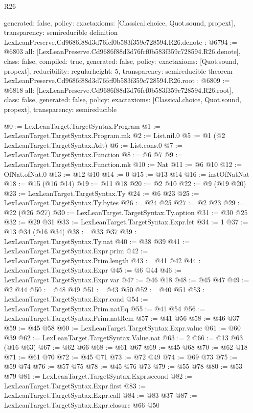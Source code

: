 \begin{lexlean}{R26}
\begin{coremodule}
{  generated: false,
  policy: exact{axioms: [Classical.choice, Quot.sound, propext]},
  transparency: semireducible
}
definition LexLeanPreserve.Cd9686f88d3d76fcf0b583f359c728594.R26.denote : @6794 := @6803 {
  all: [LexLeanPreserve.Cd9686f88d3d76fcf0b583f359c728594.R26.denote],
  class: false,
  compiled: true,
  generated: false,
  policy: exact{axioms: [Quot.sound, propext]},
  reducibility: regular{height: 5},
  transparency: semireducible
}
theorem LexLeanPreserve.Cd9686f88d3d76fcf0b583f359c728594.R26.root : @6809 := @6818 {
  all: [LexLeanPreserve.Cd9686f88d3d76fcf0b583f359c728594.R26.root],
  class: false,
  generated: false,
  policy: exact{axioms: [Classical.choice, Quot.sound, propext]},
  transparency: semireducible
}

@0 := LexLeanTarget.TargetSyntax.Program
@1 := LexLeanTarget.TargetSyntax.Program.mk
@2 := List.nil.{0}
@5 := @1 (@2 LexLeanTarget.TargetSyntax.Adt)
@6 := List.cons.{0}
@7 := LexLeanTarget.TargetSyntax.Function
@8 := @6 @7
@9 := LexLeanTarget.TargetSyntax.Function.mk
@10 := Nat
@11 := @6 @10
@12 := OfNat.ofNat.{0}
@13 := @12 @10
@14 := 0
@15 := @13 @14
@16 := instOfNatNat
@18 := @15 (@16 @14)
@19 := @11 @18
@20 := @2 @10
@22 := @9 (@19 @20)
@23 := LexLeanTarget.TargetSyntax.Ty
@24 := @6 @23
@25 := LexLeanTarget.TargetSyntax.Ty.bytes
@26 := @24 @25
@27 := @2 @23
@29 := @22 (@26 @27)
@30 := LexLeanTarget.TargetSyntax.Ty.option
@31 := @30 @25
@32 := @29 @31
@33 := LexLeanTarget.TargetSyntax.Expr.let
@34 := 1
@37 := @13 @34 (@16 @34)
@38 := @33 @37
@39 := LexLeanTarget.TargetSyntax.Ty.nat
@40 := @38 @39
@41 := LexLeanTarget.TargetSyntax.Expr.prim
@42 := LexLeanTarget.TargetSyntax.Prim.length
@43 := @41 @42
@44 := LexLeanTarget.TargetSyntax.Expr
@45 := @6 @44
@46 := LexLeanTarget.TargetSyntax.Expr.var
@47 := @46 @18
@48 := @45 @47
@49 := @2 @44
@50 := @48 @49
@51 := @43 @50
@52 := @40 @51
@53 := LexLeanTarget.TargetSyntax.Expr.cond
@54 := LexLeanTarget.TargetSyntax.Prim.natEq
@55 := @41 @54
@56 := LexLeanTarget.TargetSyntax.Prim.natRem
@57 := @41 @56
@58 := @46 @37
@59 := @45 @58
@60 := LexLeanTarget.TargetSyntax.Expr.value
@61 := @60 @39
@62 := LexLeanTarget.TargetSyntax.Value.nat
@63 := 2
@66 := @13 @63 (@16 @63)
@67 := @62 @66
@68 := @61 @67
@69 := @45 @68
@70 := @62 @18
@71 := @61 @70
@72 := @45 @71
@73 := @72 @49
@74 := @69 @73
@75 := @59 @74
@76 := @57 @75
@78 := @45 @76 @73
@79 := @55 @78
@80 := @53 @79
@81 := LexLeanTarget.TargetSyntax.Expr.second
@82 := LexLeanTarget.TargetSyntax.Expr.first
@83 := LexLeanTarget.TargetSyntax.Expr.call
@84 := @83 @37
@87 := LexLeanTarget.TargetSyntax.Expr.closure @66 @50

\end{coremodule}
\end{lexlean}

